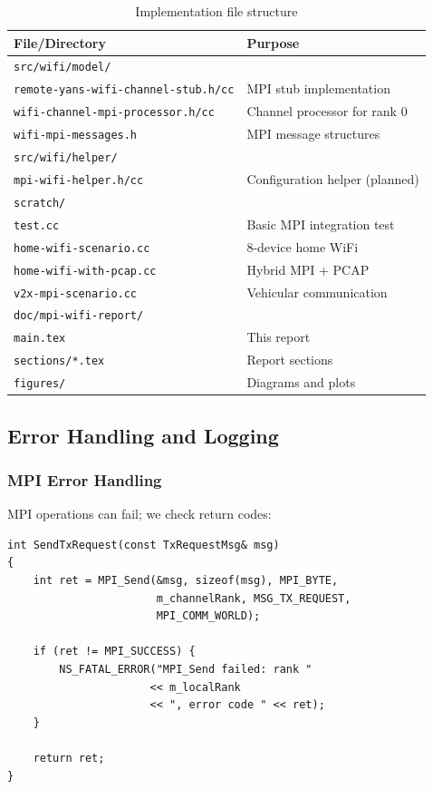 \begin{table}[htbp]
\centering
\caption{Implementation file structure}
\label{tab:file-structure}
\small
\begin{tabular}{@{}lp{8cm}@{}}
\toprule
\textbf{File/Directory} & \textbf{Purpose} \\
\midrule
\texttt{src/wifi/model/} & \\
\quad\texttt{remote-yans-wifi-channel-stub.h/cc} & MPI stub implementation \\
\quad\texttt{wifi-channel-mpi-processor.h/cc} & Channel processor for rank 0 \\
\quad\texttt{wifi-mpi-messages.h} & MPI message structures \\
\midrule
\texttt{src/wifi/helper/} & \\
\quad\texttt{mpi-wifi-helper.h/cc} & Configuration helper (planned) \\
\midrule
\texttt{scratch/} & \\
\quad\texttt{test.cc} & Basic MPI integration test \\
\quad\texttt{home-wifi-scenario.cc} & 8-device home WiFi \\
\quad\texttt{home-wifi-with-pcap.cc} & Hybrid MPI + PCAP \\
\quad\texttt{v2x-mpi-scenario.cc} & Vehicular communication \\
\midrule
\texttt{doc/mpi-wifi-report/} & \\
\quad\texttt{main.tex} & This report \\
\quad\texttt{sections/*.tex} & Report sections \\
\quad\texttt{figures/} & Diagrams and plots \\
\bottomrule
\end{tabular}
\end{table}

\subsection{Error Handling and Logging}

\subsubsection{MPI Error Handling}

MPI operations can fail; we check return codes:

\begin{lstlisting}[style=cpp, caption={MPI error handling}]
int SendTxRequest(const TxRequestMsg& msg)
{
    int ret = MPI_Send(&msg, sizeof(msg), MPI_BYTE,
                       m_channelRank, MSG_TX_REQUEST,
                       MPI_COMM_WORLD);
    
    if (ret != MPI_SUCCESS) {
        NS_FATAL_ERROR("MPI_Send failed: rank " 
                      << m_localRank 
                      << ", error code " << ret);
    }
    
    return ret;
}
\end{lstlisting}

